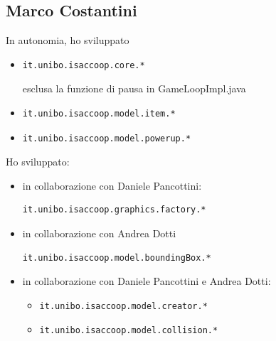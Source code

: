 \documentclass[a4paper,12pt]{report}
\begin{document}
\subsection*{Marco Costantini}
In autonomia, ho sviluppato
\begin{itemize}
    \item \begin{verbatim}it.unibo.isaccoop.core.* \end{verbatim} esclusa la funzione di pausa in GameLoopImpl.java
    \item \begin{verbatim}it.unibo.isaccoop.model.item.* \end{verbatim}
    \item \begin{verbatim}it.unibo.isaccoop.model.powerup.* \end{verbatim}
\end{itemize}
Ho sviluppato: 
\begin{itemize}
    \item in collaborazione con Daniele Pancottini: \begin{verbatim}it.unibo.isaccoop.graphics.factory.* \end{verbatim}
    \item in collaborazione con Andrea Dotti \begin{verbatim}it.unibo.isaccoop.model.boundingBox.* \end{verbatim}
    \item in collaborazione con Daniele Pancottini e Andrea Dotti:  
    \begin{itemize}
        \item \begin{verbatim}it.unibo.isaccoop.model.creator.* \end{verbatim} 
        \item \begin{verbatim}it.unibo.isaccoop.model.collision.* \end{verbatim}
    \end{itemize}
\end{itemize} 
\end{document}
